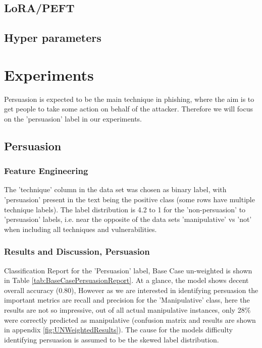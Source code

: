 \documentclass[
	letterpaper, %
	12pt, %
	unnumberedsections, %
	twoside, %
]{LTJournalArticle}
\begin{document}
\subsection{LoRA/PEFT}
\subsection{Hyper parameters}







\section{Experiments}
Persuasion is expected to be the main technique in phishing, where the aim is to get people to take some action on behalf of the attacker. Therefore we will focus on the 'persuasion' label in our experiments.

\subsection{Persuasion}
\subsubsection{Feature Engineering}
The 'technique' column in the data set was chosen as binary label, with 'persuasion' present in the text being the positive class (some rows have multiple technique labels). The label distribution is 4.2 to 1 for the 'non-persuasion' to 'persuasion' labels, i.e. near the opposite of the data sets 'manipulative' vs 'not' when including all techniques and vulnerabilities.

\subsubsection{Results and Discussion, Persuasion}
Classification Report for the 'Persuasion' label, Base Case un-weighted is shown in Table \ref{tab:BaseCasePersuasionReport}. At a glance, the model shows decent overall accuracy (0.80), However as we are interested in identifying persuasion the important metrics are recall and precision for the 'Manipulative' class, here the results are not so impressive, out of all actual manipulative instances, only 28\% were correctly predicted as manipulative (confusion matrix and results are shown in appendix \ref{fig:UNWeightedResults}). The cause for the models difficulty identifying persuasion is assumed to be the skewed label distribution.
\end{document}
